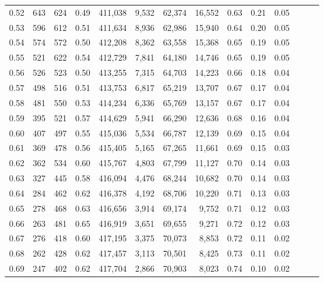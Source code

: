 \begin{tabular}{rrrrrrrrrrrrrr}
0.52 &     643 &    624 &  0.49 &  411,038 &    9,532 &  62,374 &  16,552 &  0.63 &  0.21 &      0.05 \\
0.53 &     596 &    612 &  0.51 &  411,634 &    8,936 &  62,986 &  15,940 &  0.64 &  0.20 &      0.05 \\
0.54 &     574 &    572 &  0.50 &  412,208 &    8,362 &  63,558 &  15,368 &  0.65 &  0.19 &      0.05 \\
0.55 &     521 &    622 &  0.54 &  412,729 &    7,841 &  64,180 &  14,746 &  0.65 &  0.19 &      0.05 \\
0.56 &     526 &    523 &  0.50 &  413,255 &    7,315 &  64,703 &  14,223 &  0.66 &  0.18 &      0.04 \\
0.57 &     498 &    516 &  0.51 &  413,753 &    6,817 &  65,219 &  13,707 &  0.67 &  0.17 &      0.04 \\
0.58 &     481 &    550 &  0.53 &  414,234 &    6,336 &  65,769 &  13,157 &  0.67 &  0.17 &      0.04 \\
0.59 &     395 &    521 &  0.57 &  414,629 &    5,941 &  66,290 &  12,636 &  0.68 &  0.16 &      0.04 \\
0.60 &     407 &    497 &  0.55 &  415,036 &    5,534 &  66,787 &  12,139 &  0.69 &  0.15 &      0.04 \\
0.61 &     369 &    478 &  0.56 &  415,405 &    5,165 &  67,265 &  11,661 &  0.69 &  0.15 &      0.03 \\
0.62 &     362 &    534 &  0.60 &  415,767 &    4,803 &  67,799 &  11,127 &  0.70 &  0.14 &      0.03 \\
0.63 &     327 &    445 &  0.58 &  416,094 &    4,476 &  68,244 &  10,682 &  0.70 &  0.14 &      0.03 \\
0.64 &     284 &    462 &  0.62 &  416,378 &    4,192 &  68,706 &  10,220 &  0.71 &  0.13 &      0.03 \\
0.65 &     278 &    468 &  0.63 &  416,656 &    3,914 &  69,174 &   9,752 &  0.71 &  0.12 &      0.03 \\
0.66 &     263 &    481 &  0.65 &  416,919 &    3,651 &  69,655 &   9,271 &  0.72 &  0.12 &      0.03 \\
0.67 &     276 &    418 &  0.60 &  417,195 &    3,375 &  70,073 &   8,853 &  0.72 &  0.11 &      0.02 \\
0.68 &     262 &    428 &  0.62 &  417,457 &    3,113 &  70,501 &   8,425 &  0.73 &  0.11 &      0.02 \\
0.69 &     247 &    402 &  0.62 &  417,704 &    2,866 &  70,903 &   8,023 &  0.74 &  0.10 &      0.02 \\

\end{tabular}
